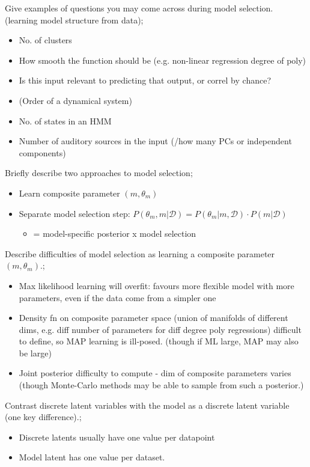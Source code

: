 \documentclass{article}
\begin{document}
Give examples of questions you may come across during model selection. (learning model structure from data); \begin{itemize}
    \item No. of clusters
    \item How smooth the function should be (e.g. non-linear regression degree of poly)
    \item Is this input relevant to predicting that output, or correl by chance?
    \item (Order of a dynamical system)
    \item No. of states in an HMM
    \item Number of auditory sources in the input (/how many PCs or independent components)
\end{itemize}

Briefly describe two approaches to model selection; \begin{itemize}
    \item Learn composite parameter $(m, \theta_m)$
    \item Separate model selection step: $P(\theta_m, m|\mathcal{D})=P(\theta_m|m, \mathcal{D})\cdot P(m|\mathcal{D})$
    \begin{itemize}
        \item = model-specific posterior x model selection
    \end{itemize}
\end{itemize}

Describe difficulties of model selection as learning a composite parameter $(m, \theta_m)$.; \begin{itemize}
    \item Max likelihood learning will overfit: favours more flexible model with more parameters, even if the data come from a simpler one
    \item Density fn on composite parameter space (union of manifolds of different dims, e.g. diff number of parameters for diff degree poly regressions) difficult to define, so MAP learning is ill-posed. (though if ML large, MAP may also be large)
    \item Joint posterior difficulty to compute - dim of composite parameters varies (though Monte-Carlo methods may be able to sample from such a posterior.)
\end{itemize}

Contrast discrete latent variables with the model as a discrete latent variable (one key difference).; \begin{itemize}
    \item Discrete latents usually have one value per datapoint
    \item Model latent has one value per dataset.
\end{itemize}
\end{document}

